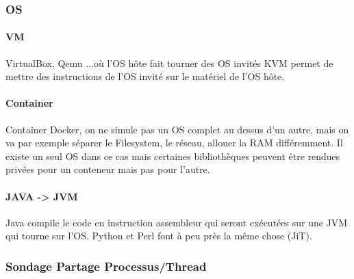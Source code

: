 \documentclass[11pt]{article}
\begin{document}
\subsubsection{OS}
\paragraph{VM}
VirtualBox, Qemu ...où l'OS hôte fait tourner des OS invités
KVM permet de mettre des instructions de l'OS invité sur le matériel de l'OS hôte.
\paragraph{Container}
Container Docker, on ne simule pas un OS complet au dessus d'un autre, mais on va par exemple séparer le Filesystem, le réseau, allouer la RAM différemment. Il existe un seul OS dans ce cas mais certaines bibliothèques peuvent être rendues privées pour un conteneur mais pas pour l'autre.
\paragraph{JAVA -> JVM}
Java compile le code en instruction assembleur qui seront exécutées sur une JVM qui tourne sur l'OS. Python et Perl font à peu près la même chose (JiT).

\subsubsection{Sondage Partage Processus/Thread}
\end{document}
